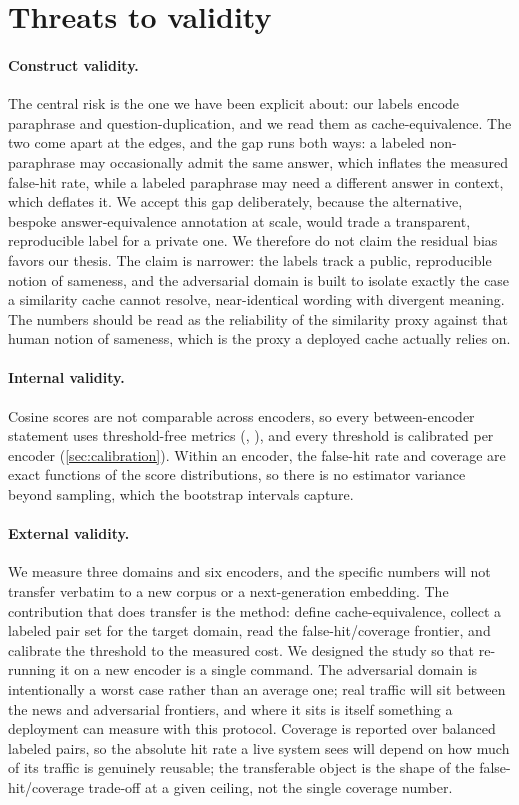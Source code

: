 \section{Threats to validity}
\label{sec:threats}

\paragraph{Construct validity.}
The central risk is the one we have been explicit about: our labels encode paraphrase and
question-duplication, and we read them as cache-equivalence. The two come apart at the
edges, and the gap runs both ways: a labeled non-paraphrase may occasionally admit the same
answer, which inflates the measured false-hit rate, while a labeled paraphrase may need a
different answer in context, which deflates it. We accept this gap deliberately, because
the alternative, bespoke answer-equivalence annotation at scale, would trade a transparent,
reproducible label for a private one. We therefore do not claim the residual bias favors our
thesis. The claim is narrower: the labels track a public, reproducible notion of
sameness, and the adversarial domain is built to isolate exactly the case a similarity cache
cannot resolve, near-identical wording with divergent meaning. The numbers should be read as
the reliability of the similarity proxy against that human notion of sameness, which is the
proxy a deployed cache actually relies on.

\paragraph{Internal validity.}
Cosine scores are not comparable across encoders, so every between-encoder statement uses
threshold-free metrics (\prauc{}, \rocauc{}), and every threshold is calibrated per encoder
(\cref{sec:calibration}). Within an encoder, the false-hit rate and coverage are exact
functions of the score distributions, so there is no estimator variance beyond sampling,
which the bootstrap intervals capture.

\paragraph{External validity.}
We measure three domains and six encoders, and the specific numbers will not transfer
verbatim to a new corpus or a next-generation embedding. The contribution that does transfer
is the method: define cache-equivalence, collect a labeled pair set for the target domain,
read the false-hit/coverage frontier, and calibrate the threshold to the measured cost. We
designed the study so that re-running it on a new encoder is a single command. The
adversarial domain is intentionally a worst case rather than an average one; real traffic
will sit between the news and adversarial frontiers, and where it sits is itself something a
deployment can measure with this protocol. Coverage is reported over balanced labeled pairs, so
the absolute hit rate a live system sees will depend on how much of its traffic is genuinely
reusable; the transferable object is the shape of the false-hit/coverage trade-off at a given
ceiling, not the single coverage number.

